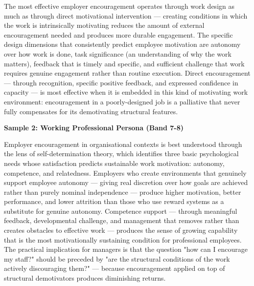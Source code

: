 The most effective employer encouragement operates through work design as much as through direct motivational intervention — creating conditions in which the work is intrinsically motivating reduces the amount of external encouragement needed and produces more durable engagement. The specific design dimensions that consistently predict employee motivation are autonomy over how work is done, task significance (an understanding of why the work matters), feedback that is timely and specific, and sufficient challenge that work requires genuine engagement rather than routine execution. Direct encouragement — through recognition, specific positive feedback, and expressed confidence in capacity — is most effective when it is embedded in this kind of motivating work environment: encouragement in a poorly-designed job is a palliative that never fully compensates for its demotivating structural features.

\textbf{Sample 2: Working Professional Persona (Band 7-8)}

Employer encouragement in organisational contexts is best understood through the lens of self-determination theory, which identifies three basic psychological needs whose satisfaction predicts sustainable work motivation: autonomy, competence, and relatedness. Employers who create environments that genuinely support employee autonomy — giving real discretion over how goals are achieved rather than purely nominal independence — produce higher motivation, better performance, and lower attrition than those who use reward systems as a substitute for genuine autonomy. Competence support — through meaningful feedback, developmental challenge, and management that removes rather than creates obstacles to effective work — produces the sense of growing capability that is the most motivationally sustaining condition for professional employees. The practical implication for managers is that the question "how can I encourage my staff?" should be preceded by "are the structural conditions of the work actively discouraging them?" — because encouragement applied on top of structural demotivators produces diminishing returns.

\separator


